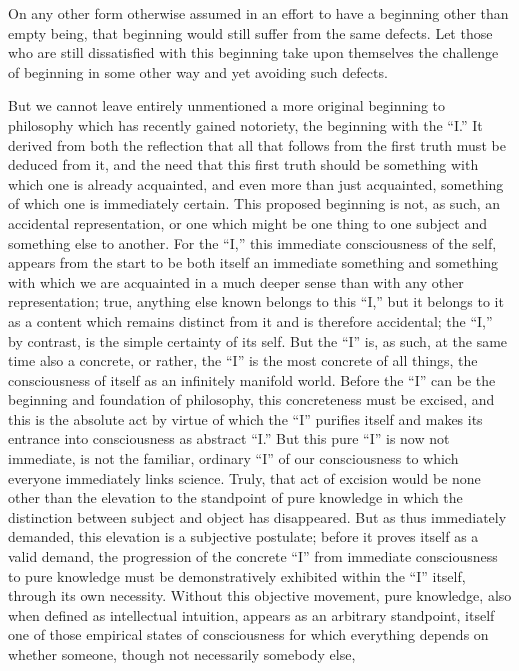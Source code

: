 On any other form otherwise assumed
in an effort to have a beginning
other than empty being,
that beginning would still
suffer from the same defects.
Let those who are still dissatisfied
with this beginning take upon themselves
the challenge of beginning in some other way
and yet avoiding such defects.

But we cannot leave entirely unmentioned
a more original beginning to philosophy
which has recently gained notoriety,
the beginning with the “I.”
It derived from both the reflection that
all that follows from the first truth
must be deduced from it,
and the need that this first truth
should be something with which one is already acquainted,
and even more than just acquainted,
something of which one is immediately certain.
This proposed beginning is not,
as such, an accidental representation,
or one which might be one thing
to one subject and something else to another.
For the “I,” this immediate consciousness of the self,
appears from the start to be both itself
an immediate something and something with which
we are acquainted in a much deeper sense
than with any other representation;
true, anything else known belongs to this “I,”
but it belongs to it as a content which remains
distinct from it and is therefore accidental;
the “I,” by contrast, is the simple certainty of its self.
But the “I” is, as such, at the same time also a concrete,
or rather, the “I” is the most concrete of all things,
the consciousness of itself as an infinitely manifold world.
Before the “I” can be the beginning and foundation of philosophy,
this concreteness must be excised,
and this is the absolute act by virtue of which
the “I” purifies itself and makes its entrance
into consciousness as abstract “I.”
But this pure “I” is now not immediate,
is not the familiar, ordinary “I” of our consciousness
to which everyone immediately links science.
Truly, that act of excision would be
none other than the elevation to the standpoint of pure knowledge in
which the distinction between subject and object has disappeared.
But as thus immediately demanded,
this elevation is a subjective postulate;
before it proves itself as a valid demand,
the progression of the concrete “I”
from immediate consciousness to pure knowledge
must be demonstratively exhibited within the “I” itself,
through its own necessity.
Without this objective movement, pure knowledge,
also when defined as intellectual intuition,
appears as an arbitrary standpoint,
itself one of those empirical states of consciousness
for which everything depends on whether someone,
though not necessarily somebody else,
